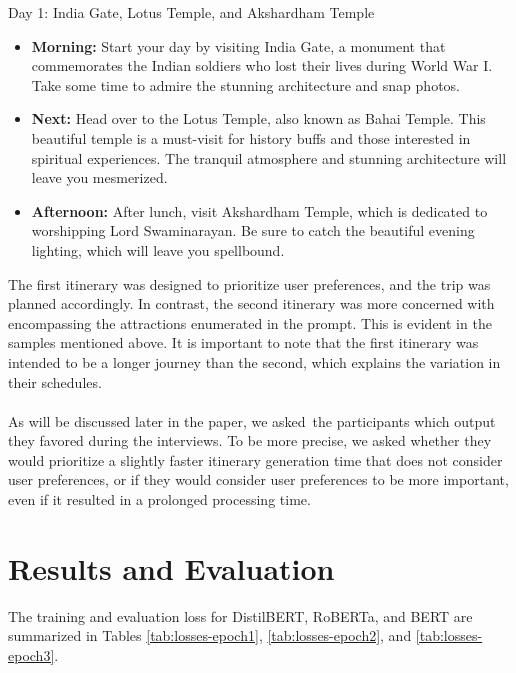 \documentclass[conference]{IEEEtran}
\begin{document}
        \begin{tcolorbox}[colframe=black!75!white, colback=white!90!black, title=Sample One-Day Itinerary without user preferences]
        Day 1: India Gate, Lotus Temple, and Akshardham Temple
            \begin{itemize}
                \item \textbf{Morning:} Start your day by visiting India Gate, a monument that commemorates the Indian soldiers who lost their lives during World War I. Take some time to admire the stunning architecture and snap photos.
                \item \textbf{Next:} Head over to the Lotus Temple, also known as Bahai Temple. This beautiful temple is a must-visit for history buffs and those interested in spiritual experiences. The tranquil atmosphere and stunning architecture will leave you mesmerized.
                \item \textbf{Afternoon:} After lunch, visit Akshardham Temple, which is dedicated to worshipping Lord Swaminarayan. Be sure to catch the beautiful evening lighting, which will leave you spellbound.
            \end{itemize}
        \end{tcolorbox}

            The first itinerary was designed to prioritize user preferences, and the trip was planned accordingly. In contrast, the second itinerary was more concerned with encompassing the attractions enumerated in the prompt. This is evident in the samples mentioned above.  It is important to note that the first itinerary was intended to be a longer journey than the second, which explains the variation in their schedules.{\\\\}
            As will be discussed later in the paper, we asked the participants which output they favored during the interviews. To be more precise, we asked whether they would prioritize a slightly faster itinerary generation time that does not consider user preferences, or if they would consider user preferences to be more important, even if it resulted in a prolonged processing time.


\section{Results and Evaluation}

    The training and evaluation loss for DistilBERT, RoBERTa, and BERT are summarized in Tables \ref{tab:losses-epoch1}, \ref{tab:losses-epoch2}, and \ref{tab:losses-epoch3}.
\end{document}

